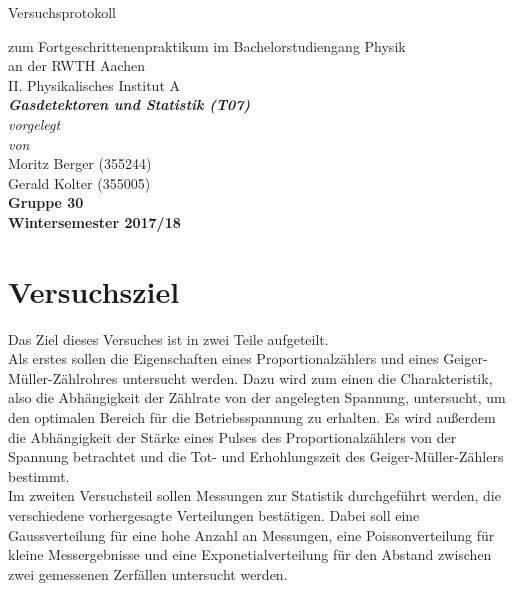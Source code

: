 \documentclass[12pt,a4paper]{article}
\author{Gerald}
\begin{document}
	\setlength{\parindent}{0pt} 
	\begin{center}
		{\LARGE Versuchsprotokoll}\\
		\begin{large}
			zum Fortgeschrittenenpraktikum im Bachelorstudiengang Physik\\[0.4cm]
			an der RWTH Aachen\\
			II. Physikalisches Institut A\\[5.5cm]
			\Large\textbf{\textsl{Gasdetektoren und Statistik (T07)}}\\[5.5cm]
			\normalsize\textit{vorgelegt\\von}\\[0.4cm]
			\large{Moritz Berger (355244)\\Gerald Kolter (355005)}\\\textbf{Gruppe 30}\\[2cm]
			\large \textbf{Wintersemester 2017/18}
		\end{large}
	\end{center}
	\newpage
	
	\tableofcontents
	\newpage
	
	
\section{Versuchsziel}
Das Ziel dieses Versuches ist in zwei Teile aufgeteilt.\\
Als erstes sollen die Eigenschaften eines Proportionalzählers und eines Geiger-Müller-Zählrohres untersucht werden. Dazu wird zum einen die Charakteristik, also die Abhängigkeit der Zählrate von der angelegten Spannung, untersucht, um den optimalen Bereich für die Betriebsspannung zu erhalten. Es wird außerdem die Abhängigkeit der Stärke eines Pulses des Proportionalzählers von der Spannung betrachtet und die Tot- und  Erhohlungszeit des Geiger-Müller-Zählers bestimmt.\\
Im zweiten Versuchsteil sollen Messungen zur Statistik durchgeführt werden, die verschiedene vorhergesagte Verteilungen bestätigen. Dabei soll eine Gaussverteilung für eine hohe Anzahl an Messungen, eine Poissonverteilung für kleine Messergebnisse und eine Exponetialverteilung für den Abstand zwischen zwei gemessenen Zerfällen untersucht werden. 
\end{document}
